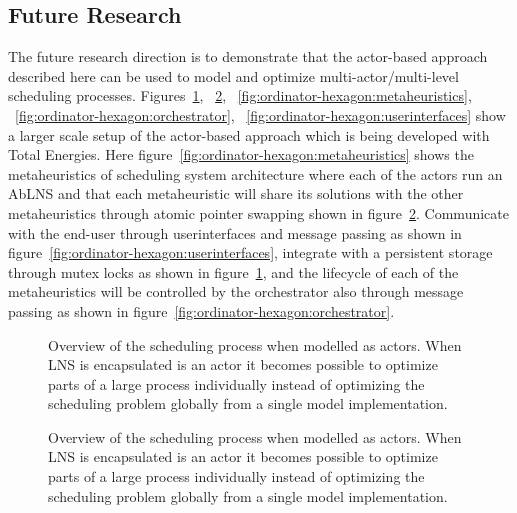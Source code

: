 \subsection{Future Research}
\label{sec:discussion:future_research}
The future research direction is to demonstrate that
the actor-based approach described here can be used to model and optimize 
multi-actor/multi-level scheduling processes. 
Figures~\ref{fig:ordinator-hexagon:persistence},
~\ref{fig:ordinator-hexagon:atomicpointerswap},
~\ref{fig:ordinator-hexagon:metaheuristics},
~\ref{fig:ordinator-hexagon:orchestrator},
~\ref{fig:ordinator-hexagon:userinterfaces}
show a larger scale setup of the actor-based approach which is being developed with Total Energies.
Here figure~\ref{fig:ordinator-hexagon:metaheuristics}
shows the metaheuristics of scheduling system architecture where each of the actors run an AbLNS
and that each metaheuristic will share its solutions with the other
metaheuristics through atomic pointer swapping shown in figure~\ref{fig:ordinator-hexagon:atomicpointerswap}.
Communicate with the end-user
through userinterfaces and message passing as shown in figure~\ref{fig:ordinator-hexagon:userinterfaces}, 
integrate with a persistent storage through mutex
locks as shown in figure~\ref{fig:ordinator-hexagon:persistence}, 
and the lifecycle of each of the metaheuristics will be controlled by
the orchestrator also through message passing as shown in figure~\ref{fig:ordinator-hexagon:orchestrator}. 

% 	
\begin{figure}[H]
	\centering
	
	\resizebox{0.7\textwidth}{!}{
		\drawModelSetupHexagon[persistence=true]
	}
	\caption{
		Overview of the scheduling process when modelled as actors. When LNS is encapsulated 
		is an actor it becomes possible to optimize parts of a large process individually instead of 
		optimizing the scheduling problem globally from a single model implementation.
	}
	\label{fig:ordinator-hexagon:persistence}
\end{figure}
\begin{figure}[H]
	\centering
	
	\resizebox{0.7\textwidth}{!}{
		\drawModelSetupHexagon[atomicpointerswap=true]
	}
	\caption{
		Overview of the scheduling process when modelled as actors. When LNS is encapsulated 
		is an actor it becomes possible to optimize parts of a large process individually instead of 
		optimizing the scheduling problem globally from a single model implementation.
	}
	\label{fig:ordinator-hexagon:atomicpointerswap}
\end{figure}

